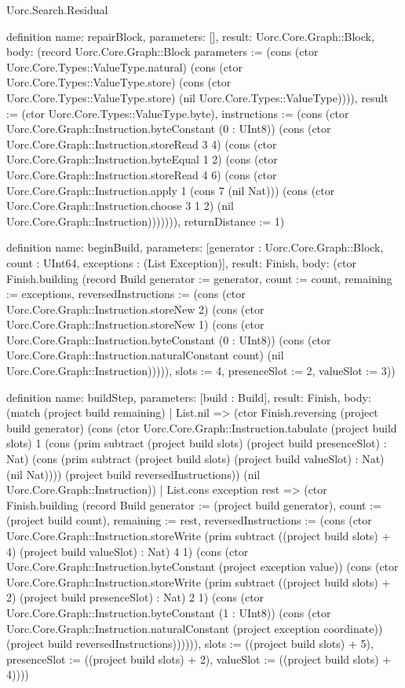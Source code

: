 \begin{lexlean}{Uorc.Search.Residual}
\begin{semanticmodule}
definition{
  name: repairBlock,
  parameters: [],
  result: Uorc.Core.Graph::Block,
  body: (record Uorc.Core.Graph::Block {parameters := (cons (ctor Uorc.Core.Types::ValueType.natural) (cons (ctor Uorc.Core.Types::ValueType.store) (cons (ctor Uorc.Core.Types::ValueType.store) (nil Uorc.Core.Types::ValueType)))), result := (ctor Uorc.Core.Types::ValueType.byte), instructions := (cons (ctor Uorc.Core.Graph::Instruction.byteConstant (0 : UInt8)) (cons (ctor Uorc.Core.Graph::Instruction.storeRead 3 4) (cons (ctor Uorc.Core.Graph::Instruction.byteEqual 1 2) (cons (ctor Uorc.Core.Graph::Instruction.storeRead 4 6) (cons (ctor Uorc.Core.Graph::Instruction.apply 1 (cons 7 (nil Nat))) (cons (ctor Uorc.Core.Graph::Instruction.choose 3 1 2) (nil Uorc.Core.Graph::Instruction))))))), returnDistance := 1})
}

definition{
  name: beginBuild,
  parameters: [generator : Uorc.Core.Graph::Block, count : UInt64, exceptions : (List Exception)],
  result: Finish,
  body: (ctor Finish.building (record Build {generator := generator, count := count, remaining := exceptions, reversedInstructions := (cons (ctor Uorc.Core.Graph::Instruction.storeNew 2) (cons (ctor Uorc.Core.Graph::Instruction.storeNew 1) (cons (ctor Uorc.Core.Graph::Instruction.byteConstant (0 : UInt8)) (cons (ctor Uorc.Core.Graph::Instruction.naturalConstant count) (nil Uorc.Core.Graph::Instruction))))), slots := 4, presenceSlot := 2, valueSlot := 3}))
}

definition{
  name: buildStep,
  parameters: [build : Build],
  result: Finish,
  body: (match (project build remaining)
    | List.nil => (ctor Finish.reversing (project build generator) (cons (ctor Uorc.Core.Graph::Instruction.tabulate (project build slots) 1 (cons (prim subtract (project build slots) (project build presenceSlot) : Nat) (cons (prim subtract (project build slots) (project build valueSlot) : Nat) (nil Nat)))) (project build reversedInstructions)) (nil Uorc.Core.Graph::Instruction))
    | List.cons exception rest => (ctor Finish.building (record Build {generator := (project build generator), count := (project build count), remaining := rest, reversedInstructions := (cons (ctor Uorc.Core.Graph::Instruction.storeWrite (prim subtract ((project build slots) + 4) (project build valueSlot) : Nat) 4 1) (cons (ctor Uorc.Core.Graph::Instruction.byteConstant (project exception value)) (cons (ctor Uorc.Core.Graph::Instruction.storeWrite (prim subtract ((project build slots) + 2) (project build presenceSlot) : Nat) 2 1) (cons (ctor Uorc.Core.Graph::Instruction.byteConstant (1 : UInt8)) (cons (ctor Uorc.Core.Graph::Instruction.naturalConstant (project exception coordinate)) (project build reversedInstructions)))))), slots := ((project build slots) + 5), presenceSlot := ((project build slots) + 2), valueSlot := ((project build slots) + 4)})))
}


\end{semanticmodule}
\end{lexlean}
